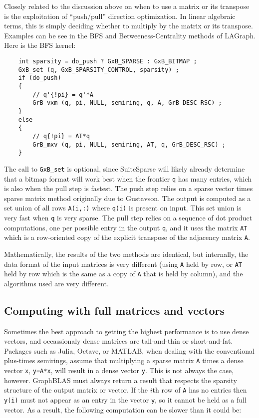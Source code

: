 \documentclass[12pt]{article}
\begin{document}
Closely related to the discussion above on when to use a matrix or its
transpose is the exploitation of ``push/pull'' direction optimization.  In
linear algebraic terms, this is simply deciding whether to multiply by the
matrix or its transpose.  Examples can be see in the BFS and
Betweeness-Centrality methods of LAGraph.  Here is the BFS kernel:

    {\scriptsize
    \begin{verbatim}
    int sparsity = do_push ? GxB_SPARSE : GxB_BITMAP ;
    GxB_set (q, GxB_SPARSITY_CONTROL, sparsity) ;
    if (do_push)
    {
        // q'{!pi} = q'*A
        GrB_vxm (q, pi, NULL, semiring, q, A, GrB_DESC_RSC) ;
    }
    else
    {
        // q{!pi} = AT*q
        GrB_mxv (q, pi, NULL, semiring, AT, q, GrB_DESC_RSC) ;
    }\end{verbatim}}

The call to \verb'GxB_set' is optional, since SuiteSparse will likely already
determine that a bitmap format will work best when the frontier \verb'q' has
many entries, which is also when the pull step is fastest.  The push step
relies on a sparse vector times sparse matrix method originally due to
Gustavson.  The output is computed as a set union of all rows \verb'A(i,:)'
where \verb'q(i)' is present on input.  This set union is very fast when
\verb'q' is very sparse.  The pull step relies on a sequence of dot product
computations, one per possible entry in the output \verb'q', and it uses the
matrix \verb"AT" which is a row-oriented copy of the explicit transpose of the
adjacency matrix \verb'A'.

Mathematically, the results of the two methods are identical, but internally,
the data format of the input matrices is very different (using \verb'A' held
by row, or \verb'AT' held by row which is the same as a copy of \verb'A' that
is held by column), and the algorithms used are very different.

\subsection{Computing with full matrices and vectors}

Sometimes the best approach to getting the highest performance is to use dense
vectors, and occassionaly dense matrices are tall-and-thin or short-and-fat.
Packages such as Julia, Octave, or MATLAB, when dealing with the conventional
plus-times semirings, assume that multiplying a sparse matrix \verb'A' times a
dense vector \verb'x', \verb'y=A*x', will result in a dense vector \verb'y'.
This is not always the case, however. GraphBLAS must always return a result
that respects the sparsity structure of the output matrix or vector.  If the
$i$th row of \verb'A' has no entries then \verb'y(i)' must not appear as an
entry in the vector \verb'y', so it cannot be held as a full vector.  As a
result, the following computation can be slower than it could be:
\end{document}
